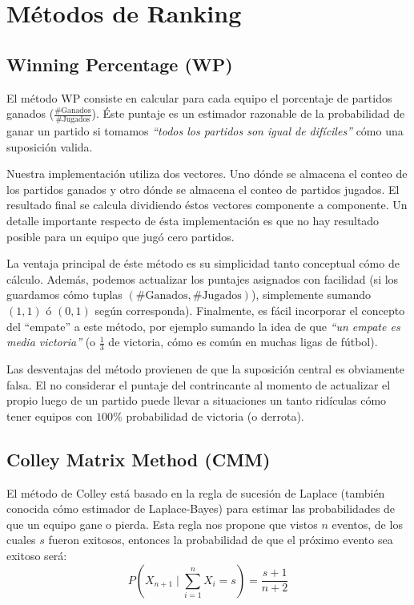 \documentclass[a4paper]{article}
\begin{document}
\section{Métodos de Ranking} \label{sec:metodos-de-ranking}

\subsection{Winning Percentage (WP)}

El método WP consiste en calcular para cada equipo el porcentaje de partidos ganados ($\frac{\text{\#Ganados}}{\text{\#Jugados}}$). Éste puntaje es un estimador razonable de la probabilidad de ganar un partido si tomamos \textit{``todos los partidos son igual de difíciles''} cómo una suposición valida.

Nuestra implementación utiliza dos vectores. Uno dónde se almacena el conteo de los partidos ganados y otro dónde se almacena el conteo de partidos jugados. El resultado final se calcula dividiendo éstos vectores componente a componente. Un detalle importante respecto de ésta implementación es que no hay resultado posible para un equipo que jugó cero partidos.

La ventaja principal de éste método es su simplicidad tanto conceptual cómo de cálculo. Además, podemos actualizar los puntajes asignados con facilidad (si los guardamos cómo tuplas $(\text{\#Ganados},\text{\#Jugados})$), simplemente sumando $(1,1)$ ó $(0,1)$ según corresponda). Finalmente, es fácil incorporar el concepto del ``empate'' a este método, por ejemplo sumando la idea de que \textit{``un empate es media victoria''} (o $\frac{1}{3}$ de victoria, cómo es común en muchas ligas de fútbol).

Las desventajas del método provienen de que la suposición central es obviamente falsa. El no considerar el puntaje del contrincante al momento de actualizar el propio luego de un partido puede llevar a situaciones un tanto ridículas cómo tener equipos con $100\%$ probabilidad de victoria (o derrota).

\subsection{Colley Matrix Method (CMM)}

El método de Colley está basado en la regla de sucesión de Laplace (también conocida cómo estimador de Laplace-Bayes) para estimar las probabilidades de que un equipo gane o pierda. Esta regla nos propone que vistos $n$ eventos, de los cuales $s$ fueron exitosos, entonces la probabilidad de que el próximo evento sea exitoso será:
\begin{equation}
    P(X_{n+1} \mid \sum_{i=1}^n X_i = s ) = \frac{s+1}{n+2}
    \label{eq:Laplace-Rule}
\end{equation}
\end{document}
